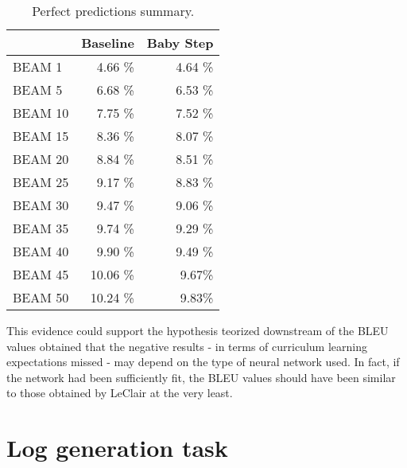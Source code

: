 \begin{table}[h!]
    \centering
    \begin{tabular}{l|r|r} 
    & Baseline & Baby Step\\ [0.5ex] 
    \hline
    BEAM 1 & 4.66 \% & 4.64 \%\\  
    BEAM 5 & 6.68 \% & 6.53 \% \\ 
    BEAM 10 & 7.75 \% & 7.52 \%\\
    BEAM 15 & 8.36 \% & 8.07 \%\\
    BEAM 20 & 8.84 \% & 8.51 \%\\
    BEAM 25 & 9.17 \% & 8.83 \%\\
    BEAM 30 & 9.47 \% & 9.06 \%\\
    BEAM 35 & 9.74 \% & 9.29 \%\\
    BEAM 40 & 9.90 \% & 9.49 \%\\
    BEAM 45 & 10.06 \%& 9.67\%\\
    BEAM 50 & 10.24 \%& 9.83\%\\ [1ex]
    \end{tabular}
    \caption{Perfect predictions summary.}
    \label{table:2}
\end{table}
This evidence could support the hypothesis teorized downstream of the BLEU values obtained 
that the negative results - in terms of curriculum learning 
expectations missed - may depend on the type of neural network used. 
In fact, if the network had been sufficiently 
fit, the BLEU values should have been similar to those obtained by LeClair \cite{Leclair2020} at the very least.
\section{Log generation task}